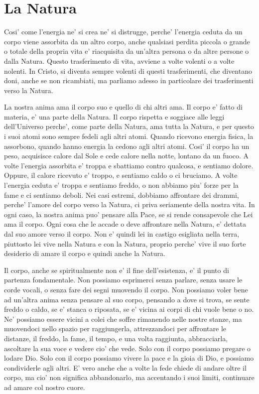 \section{La Natura}

Cosi' come l'energia ne' si crea ne' si distrugge, perche' l'energia ceduta da un corpo viene assorbita da un altro corpo, anche qualsiasi perdita piccola o grande o totale della propria vita e' riacquisita da un'altra persona o da altre persone o dalla Natura. Questo trasferimento di vita, avviene a volte volenti o a volte nolenti. In Cristo, si diventa sempre volenti di questi trasferimenti, che diventano doni, anche se non ricambiati, ma parliamo adesso in particolare dei trasferimenti verso la Natura. 

La nostra anima ama il corpo suo e quello di chi altri ama. Il corpo e' fatto di materia, e' una parte della Natura. Il corpo rispetta e soggiace alle leggi dell'Universo perche', come parte della Natura, ama tutta la Natura, e per questo i suoi atomi sono sempre fedeli agli altri atomi. Quando ricevono energia fisica, la assorbono, quando hanno energia la cedono agli altri atomi.
Cosi' il corpo ha un peso, acquisisce calore dal Sole e cede calore nella notte, lontano da un fuoco. 
A volte l'energia assorbita e' troppa e sbattiamo contro qualcosa, e sentiamo dolore. Oppure, il calore ricevuto e' troppo, e sentiamo caldo o ci bruciamo. A volte l'energia ceduta e' troppa e sentiamo freddo, o non abbiamo piu' forze per la fame e ci sentiamo deboli. Nei casi estremi, dobbiamo affrontare dei drammi, perche' l'amore del corpo verso la Natura, ci priva seriamente della nostra vita. In ogni caso, la nostra anima puo' pensare alla Pace, se si rende consapevole che Lei ama il corpo. Ogni cosa che le accade o deve affrontare nella Natura, e' dettata dal suo amore verso il corpo. Non e' quindi lei in castigo esigliata nella terra, piuttosto lei vive nella Natura e con la Natura, proprio perche' vive il suo forte desiderio di amare il corpo e quindi anche la Natura. 

Il corpo, anche se spiritualmente non e' il fine dell'esistenza, e' il punto di partenza fondamentale. Non possiamo esprimerci senza parlare, senza usare le corde vocali, o senza fare dei segni muovendo il corpo. Non possiamo voler bene ad un'altra anima senza pensare al suo corpo, pensando a dove si trova, se sente freddo o caldo, se e' stanca o riposata, se e' vicina ai corpi di chi vuole bene o no. Ne' possiamo essere vicini a colei che soffre rimanendo nelle nostre stanze, ma muovendoci nello spazio per raggiungerla, attrezzandoci per affrontare le distanze, il freddo, la fame, il tempo, e una volta raggiunta, abbracciarla, ascoltare la sua voce e vedere cio' che vede.
Solo con il corpo possiamo pregare o lodare Dio. Solo con il corpo possiamo vivere la pace e la gioia di Dio, e possiamo condividerle agli altri. E' vero anche che a volte la fede chiede di andare oltre il corpo, ma cio' non significa abbandonarlo, ma accentando i suoi limiti, continuare ad amare col nostro cuore.

